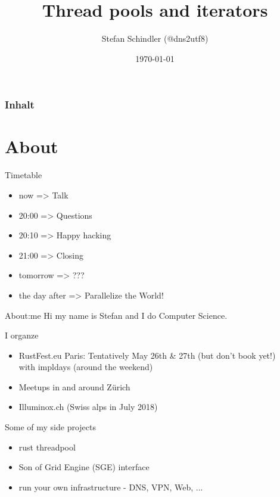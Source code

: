 \documentclass[aspectratio=1610,t]{beamer}
\title{Thread pools and iterators}
\date{\today}
\author{Stefan Schindler (@dns2utf8)}
\institute{Rust Zürichsee, Schweiz CH}
\begin{document}

\maketitle


\begin{frame}
	\frametitle{Inhalt}
	\setcounter{tocdepth}{1}
	\tableofcontents
\end{frame}



{
\section{About}
}

\begin{frame}[fragile]{Timetable}
  \begin{itemize}
    \item now => Talk
    \item 20:00 => Questions
    \item 20:10 => Happy hacking
    \item 21:00 => Closing
    \item tomorrow => ???
    \item the day after => Parallelize the World!
  \end{itemize}
\end{frame}


\begin{frame}[fragile]{About:me}
Hi my name is Stefan and I do Computer Science.

I organze
\begin{itemize}
  \item RustFest.eu Paris: Tentatively May 26th \& 27th (but don't book yet!) \\ with impldays (around the weekend)
  \item Meetups in and around Zürich
  \item Illuminox.ch (Swiss alps in July 2018)
\end{itemize}

Some of my side projects
\begin{itemize}
  \item rust threadpool
  \item Son of Grid Engine (SGE) interface
  \item run your own infrastructure - DNS, VPN, Web, ...
\end{itemize}
\end{frame}
\end{document}
